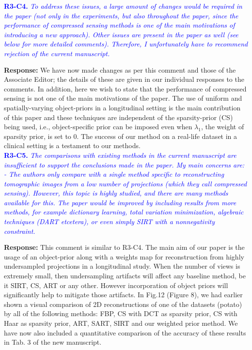 \documentclass{article}
\begin{document}
\textcolor{blue}{\textbf{R3-C4.}\textit{ To address these issues, a large amount of changes would be required in the paper (not only in the experiments, but also throughout the paper, since the performance of compressed sensing methods is one of the main motivations of introducing a new approach). Other issues are present in the paper as well (see below for more detailed comments). Therefore, I unfortunately have to recommend rejection of the current manuscript.}}

\textbf{Response:} We have now made changes as per this comment and those of the Associate Editor; the details of these are given in our individual responses to the comments. In addition, here we wish to state that the performance of compressed sensing is not one of the main motivations of the paper. The use of uniform and spatially-varying object-priors in a longitudinal setting is the main contribution of this paper and these techniques are independent of the sparsity-prior (CS) being used, i.e., object-specific prior can be imposed even when $\lambda_1$, the weight of sparsity prior, is set to $0$.  The success of our method on a real-life dataset in a clinical setting is a testament to our methods.\\


\textcolor{blue}{\textbf{R3-C5.}\textit{ The comparisons with existing methods in the current manuscript are insufficient to support the conclusions made in the paper. My main concerns are: - The authors only compare with a single method specific to reconstructing tomographic images from a low number of projections (which they call compressed sensing). However, this topic is highly studied, and there are many methods available for this. The paper would be improved by including results from more methods, for example dictionary learning, total variation minimization, algebraic techniques (DART etcetera), or even simply SIRT with a nonnegativity constraint.}}

\textbf{Response:} This comment is similar to R3-C4. The main aim of our paper is the usage of an object-prior along with a weights map for reconstruction from highly undersampled projections in a longitudinal study. When the number of views is extremely small, then undersampling artifacts will affect any baseline method, be it SIRT, CS, ART or any other. However incorporation of object priors will significantly help to mitigate those artifacts.
In Fig.12 (Figure 8), we had earlier shown a visual comparison of 2D reconstructions of one of the datasets (potato) by all of the following methods: FBP, CS with DCT as sparsity prior, CS with Haar as sparsity prior, ART, SART, SIRT and our weighted prior method.
We have now also included a quantitative comparison of the accuracy of these results in Tab. 3 of the new manuscript.\\
\end{document}
